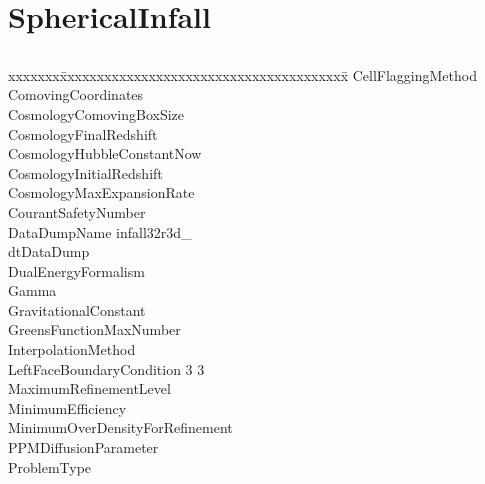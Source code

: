 \documentclass{book}
\begin{document}
\section{SphericalInfall} \label{s:SphericalInfall}

\subsection{\enzo}

{\parametersize
\begin{tabbing}
xxxxxxx\=xxxxxxxxxxxxxxxxxxxxxxxxxxxxxxxxxxxxxxx\=\kill
\> CellFlaggingMethod                   \\
\> ComovingCoordinates                \\
\> CosmologyComovingBoxSize        \\
\> CosmologyFinalRedshift             \\
\> CosmologyHubbleConstantNow       \\
\> CosmologyInitialRedshift      \\
\> CosmologyMaxExpansionRate       \\
\> CourantSafetyNumber          \\
\> DataDumpName           \> infall32r3d\_ \\
\> dtDataDump              \\
\> DualEnergyFormalism            \\
\> Gamma                   \\
\> GravitationalConstant            \\
\> GreensFunctionMaxNumber    \\
\> InterpolationMethod            \\
\> LeftFaceBoundaryCondition   3 3    \\
\> MaximumRefinementLevel               \\
\> MinimumEfficiency                  \\
\> MinimumOverDensityForRefinement    \\
\> PPMDiffusionParameter          \\
\> ProblemType                       \\

\end{tabbing}}
\end{document}

